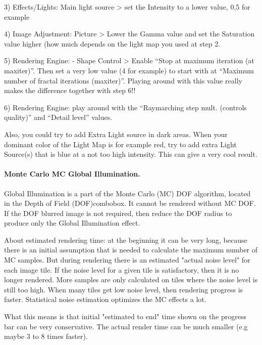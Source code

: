 3) Effects/Lights: Main light source > set the Intensity to a lower value, 0,5 for example

4) Image Adjustment: Picture > Lower the Gamma value and set the Saturation value higher (how much depends on the light map you used at step 2.

5) Rendering Engine: - Shape Control > Enable “Stop at maximum iteration (at maxiter)”. Then set a very low value (4 for example) to start with at “Maximum number of fractal iterations (maxiter)”. Playing around with this value really makes the difference together with step 6!!

6) Rendering Engine: play around with the “Raymarching step mult. (controls quality)” and “Detail level” values.

Also, you could try to add Extra Light source in dark areas. When your dominant color of the Light Map is for example red, try to add extra Light Source(s) that is blue at a not too high intensity. This can give a very cool result.


\paragraph{Monte Carlo MC Global Illumination.}
Global Illumination is a part of the Monte Carlo (MC) DOF algorithm, located in the Depth of Field (DOF)combobox. It cannot be rendered without MC DOF. If the DOF blurred image is not required, then reduce the DOF radius to produce only the Global Illumination effect.

About estimated rendering time: at the beginning it can be very long, because there is an initial assumption that is needed to calculate the maximum number of MC samples. But during rendering there is an estimated "actual noise level" for each image tile. If the noise level for a given tile is satisfactory, then it is no longer rendered. More samples are only calculated on tiles where the noise level is still too high. When many tiles get low noise level, then rendering progress is faster. Statistical noise estimation optimizes the MC effects a lot.

What this means is that initial "estimated to end" time shown on the progress bar can be very conservative. The actual render time can be much smaller (e.g maybe 3 to 8 times faster).
